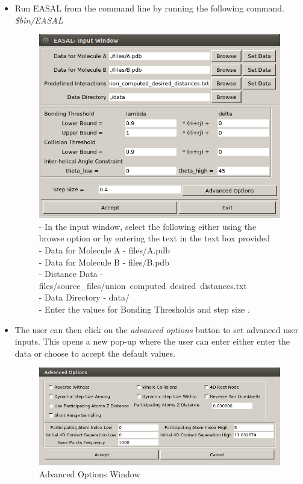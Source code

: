 \documentclass[10pt]{article}
\begin{document}

\begin{itemize}

\item Run EASAL from the command line by running the following command.
    \emph{\$bin/EASAL}

\begin{figure}[h]
	\centering
	\includegraphics[scale=0.5] {fig/InputWindow.png}
	\caption{- In the input window, select the following either using the
			browse option or by entering the text in the text box provided\\
    - Data for Molecule A - files/A.pdb\\
    - Data for Molecule B - files/B.pdb\\
    - Distance Data - files/source\_files/union\ computed\ desired\ distances.txt\\
    - Data Directory - data/\\
    - Enter the values for Bonding Thresholds and step size .
}
	\label{inputwindow}
\end{figure}


\item The user can then click on the \emph{advanced options} button to set advanced
		user inputs. This opens a new pop-up where the user can enter either
		enter the data or choose to accept the default values.

\begin{figure}[h]
\centering
\includegraphics[scale=0.5] {fig/AdvancedOptions.png}
\caption{Advanced Options Window}
\label{advancedoptions}
\end{figure}


\end{itemize}
\end{document}
